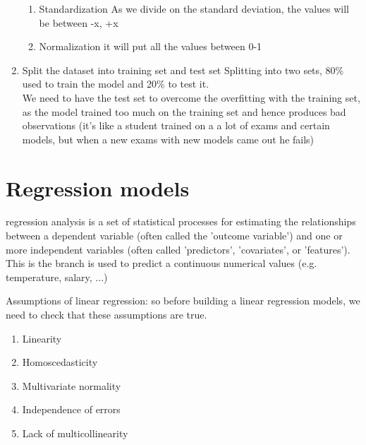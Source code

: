 \documentclass{article}
\begin{document}
\begin{enumerate}
  \begin{enumerate}
    \item Standardization
    As we divide on the standard deviation, the values will be between -x, +x
    \item Normalization
    it will put all the values between 0-1
  \end{enumerate}

  \item Split the dataset into training set and test set
  Splitting into two sets, 80\% used to train the model and 20\% to test it.\\
  We need to have the test set to overcome the overfitting with the training set, as the model trained too much on the training set and hence produces bad observations (it's like a student trained on a a lot of exams and certain models, but when a new exams with new models came out he fails)

\end{enumerate}

\section{Regression models}
regression analysis is a set of statistical processes for estimating the relationships between a dependent variable (often called the 'outcome variable') and one or more independent variables (often called 'predictors', 'covariates', or 'features').\\

This is the branch is used to predict a continuous numerical values (e.g. temperature, salary, ...)

Assumptions of linear regression: so before building a linear regression models, we need to check that these assumptions are true. 
\begin{enumerate}
  \item Linearity
  \item Homoscedasticity
  \item Multivariate normality
  \item Independence of errors
  \item Lack of multicollinearity
\end{enumerate}
\end{document}
